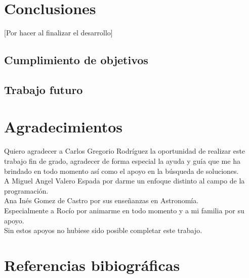 	\section{Conclusiones}
	[Por hacer al finalizar el desarrollo]
	\subsection{Cumplimiento de objetivos}
	\subsection{Trabajo futuro}
	\section{Agradecimientos}
	
	Quiero agradecer a Carlos Gregorio Rodríguez la oportunidad de realizar este trabajo fin de grado, agradecer de forma especial la ayuda y guía que me ha brindado en todo momento así como el apoyo en la búsqueda de soluciones. 
	\\ A Miguel Angel Valero Espada por darme un enfoque distinto al campo de la programación.
	\\ Ana Inés Gomez de Castro por sus enseñanzas en Astronomía.
	\\ Especialmente a Rocío por animarme en todo momento y a mi familia por su apoyo.
	\\ Sin estos apoyos no hubiese sido posible completar este trabajo.
	\section{Referencias bibiográficas}
